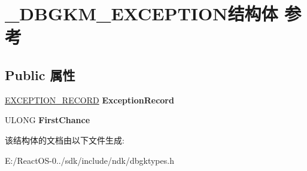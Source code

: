 \hypertarget{struct___d_b_g_k_m___e_x_c_e_p_t_i_o_n}{}\section{\+\_\+\+D\+B\+G\+K\+M\+\_\+\+E\+X\+C\+E\+P\+T\+I\+O\+N结构体 参考}
\label{struct___d_b_g_k_m___e_x_c_e_p_t_i_o_n}
\subsection*{Public 属性}
\begin{DoxyCompactItemize}
\item 
\mbox{\label{struct___d_b_g_k_m___e_x_c_e_p_t_i_o_n_af84d38ccf3e86bf028fe626a3d0def3f}} 
\hyperlink{struct___e_x_c_e_p_t_i_o_n___r_e_c_o_r_d}{E\+X\+C\+E\+P\+T\+I\+O\+N\+\_\+\+R\+E\+C\+O\+RD} {\bfseries Exception\+Record}
\item 
\mbox{\label{struct___d_b_g_k_m___e_x_c_e_p_t_i_o_n_ac55677334bfc5d08013ae72eda7efff5}} 
U\+L\+O\+NG {\bfseries First\+Chance}
\end{DoxyCompactItemize}


该结构体的文档由以下文件生成\+:\begin{DoxyCompactItemize}
\item 
E\+:/\+React\+O\+S-\/0../sdk/include/ndk/dbgktypes.\+h\end{DoxyCompactItemize}
